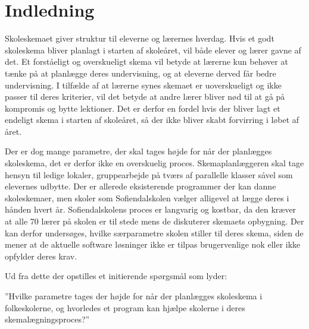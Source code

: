 \section{Indledning}
Skoleskemaet giver struktur til eleverne og lærernes hverdag. Hvis et godt skoleskema bliver planlagt i starten af skoleåret, vil både elever og lærer gavne af det. Et forståeligt og overskueligt skema vil betyde at lærerne kun behøver at tænke på at planlægge deres undervisning, og at eleverne derved får bedre undervisning. I tilfælde af at lærerne synes skemaet er uoverskueligt og ikke passer til deres kriterier, vil det betyde at andre lærer bliver nød til at gå på kompromis og bytte lektioner. Det er derfor en fordel hvis der bliver lagt et endeligt skema i starten af skoleåret, så der ikke bliver skabt forvirring i løbet af året. 

Der er dog mange parametre, der skal tages højde for når der planlægges skoleskema, det er derfor ikke en overskuelig proces. Skemaplanlæggeren skal tage hensyn til ledige lokaler, gruppearbejde på tværs af parallelle klasser såvel som elevernes udbytte. Der er allerede eksisterende programmer der kan danne skoleskemaer, men skoler som Sofiendalskolen vælger alligevel at lægge deres i hånden hvert år. Sofiendalskolens proces er langvarig og kostbar, da den kræver at alle 70 lærer på skolen er til stede mens de diskuterer skemaets opbygning. Der kan derfor undersøges, hvilke særparametre skolen stiller til deres skema, siden de mener at de aktuelle software løsninger ikke er tilpas brugervenlige nok eller ikke opfylder deres krav. 

Ud fra dette der opstilles et initierende spørgsmål som lyder:

”Hvilke parametre tages der højde for når der planlægges skoleskema i folkeskolerne, og hvorledes et program kan hjælpe skolerne i deres skemalægningsproces?”
